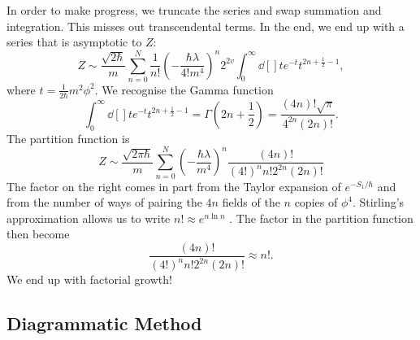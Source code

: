 In order to make progress, we truncate the series and swap summation and integration. This misses out transcendental terms.
In the end, we end up with a series that is asymptotic to $Z$:
 \begin{equation}
   Z \sim \frac{\sqrt{2\hbar}}{m} \sum_{n=0}^N \frac{1}{n!} \left( - \frac{\hbar \lambda}{4! m^4} \right)^n 2^{2v} \int_{0}^\infty \dd[]{t} e^{-t} t^{2n + \frac{1}{2} - 1}, 
\end{equation}
where $t = \frac{1}{2\hbar} m^2 \phi^2$. We recognise the Gamma function
\begin{equation}
  \int_{0}^\infty \dd[]{t} e^{-t} t^{2n + \frac{1}{2} - 1} = \Gamma(2 n + \frac{1}{2}) = \frac{(4n)! \sqrt{\pi}}{4^{2n} (2n)!}.
\end{equation}
The partition function is
\begin{equation}
Z \sim \frac{\sqrt{2 \pi \hbar}}{m} \sum_{n=0}^N \left( - \frac{\hbar \lambda}{m^4} \right)^n \frac{(4n)!}{(4!)^n n! 2^{2n} (2n)!}
\end{equation}
The factor on the right comes in part from the Taylor expansion of $e^{-S_1 / \hbar}$ and from the number of ways of pairing the $4n$ fields of the $n$ copies of $\phi^4$.
Stirling's approximation allows us to write $n! \approx e^{n \ln n}$ .
The factor in the partition function then become
\begin{equation}
  \frac{(4n)!}{(4!)^n n! 2^{2n} (2n)!} \approx n!.
\end{equation}
We end up with factorial growth!

\subsection{Diagrammatic Method}%
\label{sub:diagrammatic_method}

